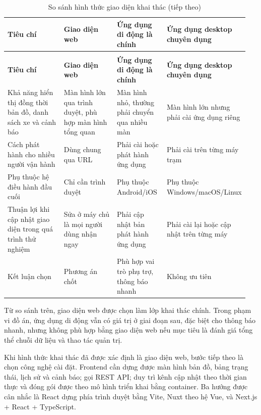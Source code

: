 \documentclass[a4paper]{extarticle}
\newcommand{\thesissettableid}[2]{%
  \renewcommand{\thetable}{#1}%
  \renewcommand{\theHtable}{#2}%
}
\begin{document}
{\thesissettableid{3.36}{condensed-bang-3-36-so-sanh-hinh-thuc-giao-dien-khai-thac}
\def\LTcaptype{table}
\begin{longtable}{|L{0.270\linewidth}|L{0.250\linewidth}|L{0.210\linewidth}|L{0.220\linewidth}|}
\caption{So sánh hình thức giao diện khai thác}\label{tab:condensed-bang-3-36-so-sanh-hinh-thuc-giao-dien-khai-thac}\\
\hline
\textbf{Tiêu chí} & \textbf{Giao diện web} & \textbf{Ứng dụng di động là chính} & \textbf{Ứng dụng desktop chuyên dụng} \\
\hline
\endfirsthead
\caption[]{So sánh hình thức giao diện khai thác (tiếp theo)}\\
\hline
\textbf{Tiêu chí} & \textbf{Giao diện web} & \textbf{Ứng dụng di động là chính} & \textbf{Ứng dụng desktop chuyên dụng} \\
\hline
\endhead
\endfoot
\endlastfoot
Khả năng hiển thị đồng thời bản đồ, danh sách xe và cảnh báo & Màn hình lớn qua trình duyệt, phù hợp màn hình tổng quan & Màn hình nhỏ, thường phải chuyển qua nhiều màn & Màn hình lớn nhưng phải cài ứng dụng riêng \\\hline
Cách phát hành cho nhiều người vận hành & Dùng chung qua URL & Phải cài hoặc phát hành ứng dụng & Phải cài trên từng máy trạm \\\hline
Phụ thuộc hệ điều hành đầu cuối & Chỉ cần trình duyệt & Phụ thuộc Android/iOS & Phụ thuộc Windows/\newline macOS/Linux \\\hline
Thuận lợi khi cập nhật giao diện trong quá trình thử nghiệm & Sửa ở máy chủ là mọi người dùng nhận ngay & Phải cập nhật bản phát hành ứng dụng & Phải cài lại hoặc cập nhật trên từng máy \\\hline
Kết luận chọn & Phương án chốt & Phù hợp vai trò phụ trợ, thông báo nhanh & Không ưu tiên \\\hline
\end{longtable}
}

Từ so sánh trên, giao diện web được chọn làm lớp khai thác chính. Trong phạm vi
đồ án, ứng dụng di động vẫn có giá trị ở giai đoạn sau, đặc biệt cho thông báo
nhanh, nhưng không phù hợp bằng giao diện web nếu mục tiêu là đánh giá tổng thể
chuỗi dữ liệu và thao tác quản trị.

Khi hình thức khai thác đã được xác định là giao diện web, bước tiếp theo là
chọn công nghệ cài đặt. Frontend cần dựng được màn hình bản đồ, bảng trạng thái,
lịch sử và cảnh báo; gọi REST API; duy trì kênh cập nhật theo thời gian thực và
đóng gói được theo mô hình triển khai bằng container. Ba hướng được cân nhắc là
React dựng phía trình duyệt bằng Vite, Nuxt theo hệ Vue, và Next.js + React +
TypeScript.
\end{document}

